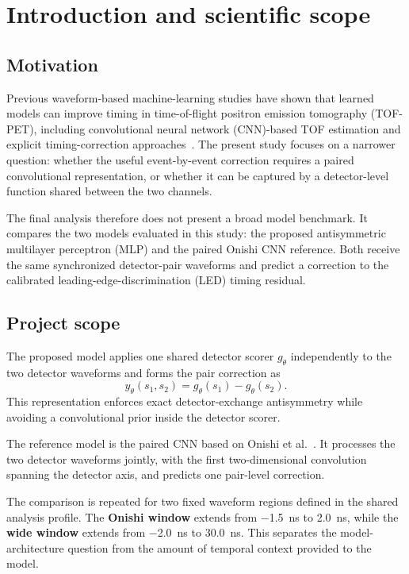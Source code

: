 \section{Introduction and scientific scope}

\subsection{Motivation}

Previous waveform-based machine-learning studies have shown that learned models can improve timing in time-of-flight positron emission tomography (TOF-PET), including convolutional neural network (CNN)-based TOF estimation and explicit timing-correction approaches~\cite{berg2018,onishi2022,feng2024,naunheim2025}. The present study focuses on a narrower question: whether the useful event-by-event correction requires a paired convolutional representation, or whether it can be captured by a detector-level function shared between the two channels.

The final analysis therefore does not present a broad model benchmark. It compares the two models evaluated in this study: the proposed antisymmetric multilayer perceptron (MLP) and the paired Onishi CNN reference. Both receive the same synchronized detector-pair waveforms and predict a correction to the calibrated leading-edge-discrimination (LED) timing residual.

\subsection{Project scope}

The proposed model applies one shared detector scorer \(g_\theta\) independently to the two detector waveforms and forms the pair correction as
\begin{equation}
    y_\theta(s_1,s_2)=g_\theta(s_1)-g_\theta(s_2).
\end{equation}
This representation enforces exact detector-exchange antisymmetry while avoiding a convolutional prior inside the detector scorer.

The reference model is the paired CNN based on Onishi et al.~\cite{onishi2022}. It processes the two detector waveforms jointly, with the first two-dimensional convolution spanning the detector axis, and predicts one pair-level correction.

The comparison is repeated for two fixed waveform regions defined in the shared analysis profile. The \textbf{Onishi window} extends from \SI{-1.5}{ns} to \SI{2.0}{ns}, while the \textbf{wide window} extends from \SI{-2.0}{ns} to \SI{30.0}{ns}. This separates the model-architecture question from the amount of temporal context provided to the model.

